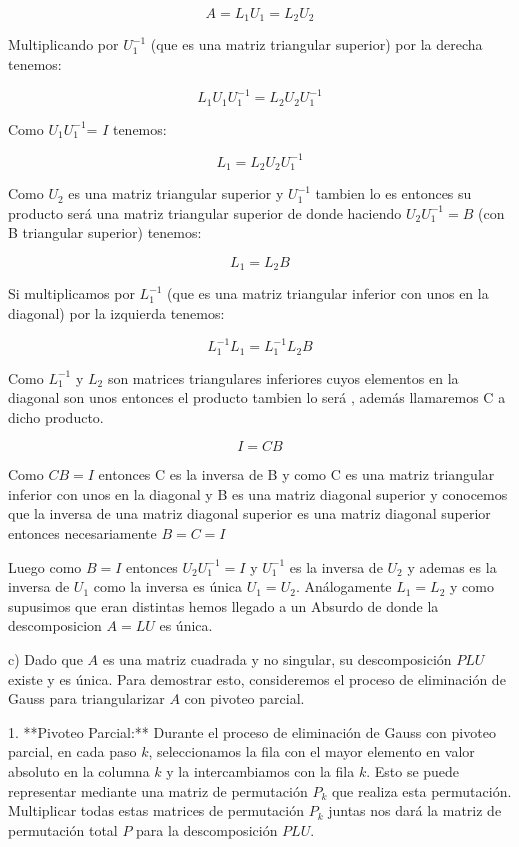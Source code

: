 \documentclass[a4paper,12pt]{article}
\begin{document}
\[ A = L_1 U_1 = L_2 U_2 \]

Multiplicando por $U_1^{-1}$ (que es una matriz triangular superior) por la derecha tenemos:

\[ L_1 U_1 U_1^{-1} = L_2 U_2 U_1^{-1}\]

Como $U_1 U_1^{-1}$= $I$ tenemos:

\[ L_1 = L_2 U_2 U_1^{-1}\]

Como $U_2$ es una matriz triangular superior y $U_1^{-1}$ tambien lo es entonces su producto será una matriz triangular superior de donde haciendo $U_2 U_1^{-1} = B$ (con B triangular superior) tenemos:

\[ L_1 = L_2 B\] 

Si multiplicamos por $L_1^{-1}$ (que es una matriz triangular inferior con unos en la diagonal) por la izquierda tenemos:

\[ L_1^{-1} L_1 =  L_1^{-1} L_2 B\] 

Como $L_1^{-1}$ y $L_2$ son matrices triangulares inferiores cuyos elementos en la diagonal son unos entonces el producto tambien lo será , además llamaremos C a dicho producto.

\[ I = C B\] 

Como $C B = I$ entonces C es la inversa de B y como C es una matriz triangular inferior con unos en la diagonal y B es una matriz diagonal superior y conocemos que la inversa de una matriz diagonal superior es una matriz diagonal superior entonces necesariamente $B = C = I$

Luego como $B = I$ entonces  $U_2 U_1^{-1} = I$ y $U_1^{-1}$ es la inversa de $U_2$ y ademas es la inversa de $U_1$ como la inversa es única $U_1 = U_2$. Análogamente $L_1 = L_2$ y como supusimos que eran distintas hemos llegado a un Absurdo de donde la descomposicion $A = L U$ es única.

c)﻿
Dado que \( A \) es una matriz cuadrada y no singular, su descomposición \( PLU \) existe y es única. Para demostrar esto, consideremos el proceso de eliminación de Gauss para triangularizar \( A \) con pivoteo parcial.

1. **Pivoteo Parcial:**
   Durante el proceso de eliminación de Gauss con pivoteo parcial, en cada paso \( k \), seleccionamos la fila con el mayor elemento en valor absoluto en la columna \( k \) y la intercambiamos con la fila \( k \). Esto se puede representar mediante una matriz de permutación \( P_k \) que realiza esta permutación. Multiplicar todas estas matrices de permutación \( P_k \) juntas nos dará la matriz de permutación total \( P \) para la descomposición \( PLU \).
\end{document}

